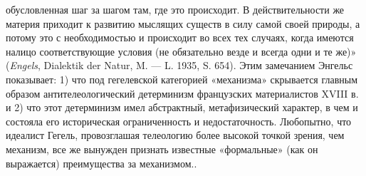 \documentclass[twoside]{article}
\begin{document}
{{{{{обусловленная шаг за шагом там, где это происходит. В действительности же
материя приходит к развитию мыслящих существ в силу самой своей природы, а
потому это с необходимостью и происходит во всех тех случаях, когда имеются
налицо соответствующие условия (не обязательно везде и всегда одни и те
же)» ({\em Engels},
Dialektik der Natur, M. — L. 1935, S. 654). Этим замечанием
Энгельс показывает: 1) что под гегелевской категорией «механизма»
скрывается главным образом антителеологический детерминизм французских
материалистов XVIII в. и 2) что этот детерминизм имел абстрактный,
метафизический характер, в чем и состояла его историческая ограниченность и
недостаточность. Любопытно, что идеалист Гегель, провозглашая телеологию
более высокой точкой зрения, чем механизм, все же вынужден признать
известные «формальные» (как он выражается) преимущества за
механизмом.}\label{bkm:bm83}.

}}}}
\end{document}
